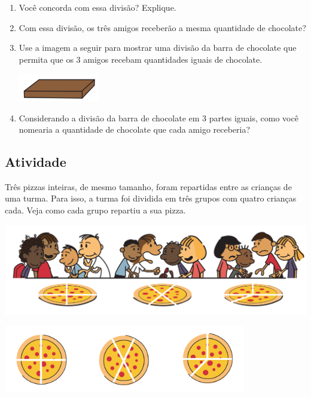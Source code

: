 \begin{enumerate} [\quad a)] %
  \item     Você concorda com essa divisão? Explique.
  \item     Com essa divisão, os três amigos receberão a mesma quantidade de chocolate?
  \item     Use a imagem a seguir para mostrar uma divisão da barra de chocolate que permita que os 3 amigos recebam quantidades iguais de chocolate.
    \begin{center}
    \includegraphics[width=100pt, keepaspectratio]{../figuras/licao01/ativ1_fig02a.png}
  \end{center}
  \item     Considerando a divisão da barra de chocolate em 3 partes iguais, como você nomearia a quantidade de chocolate que cada amigo receberia?
\end{enumerate} %

\subsection{Atividade}
Três pizzas inteiras, de mesmo tamanho, foram repartidas entre as crianças de uma turma. Para isso, a turma foi dividida em três grupos com quatro crianças cada. Veja como cada grupo repartiu a sua pizza.

  \begin{center}
    \includegraphics[width=400pt, keepaspectratio]{../figuras/licao01/ativ2_fig01.png}

    \includegraphics[width=300pt, keepaspectratio]{../figuras/licao01/ativ2_fig02.png}
  \end{center}

